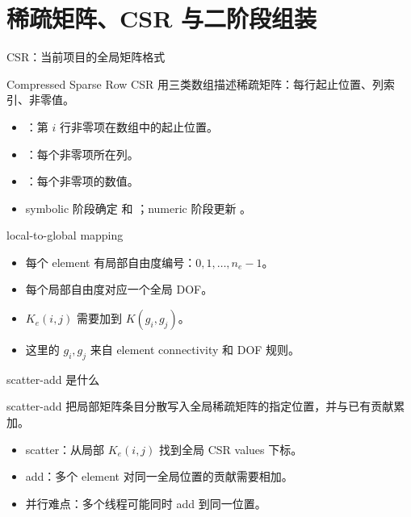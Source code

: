 \section{稀疏矩阵、CSR 与二阶段组装}

\begin{frame}{CSR：当前项目的全局矩阵格式}
\begin{block}{Compressed Sparse Row}
CSR 用三类数组描述稀疏矩阵：每行起止位置、列索引、非零值。
\end{block}
\begin{itemize}
  \item {}：第 $i$ 行非零项在数组中的起止位置。
  \item {}：每个非零项所在列。
  \item {}：每个非零项的数值。
  \item symbolic 阶段确定  和 ；numeric 阶段更新 。
\end{itemize}
\end{frame}

\begin{frame}{local-to-global mapping}
\begin{itemize}
  \item 每个 element 有局部自由度编号：$0,1,\ldots,n_e-1$。
  \item 每个局部自由度对应一个全局 DOF。
  \item $K_e(i,j)$ 需要加到 $K(g_i,g_j)$。
  \item 这里的 $g_i,g_j$ 来自 element connectivity 和 DOF 规则。
\end{itemize}
\end{frame}

\begin{frame}{scatter-add 是什么}
\begin{block}{scatter-add}
把局部矩阵条目分散写入全局稀疏矩阵的指定位置，并与已有贡献累加。
\end{block}
\begin{itemize}
  \item scatter：从局部 $K_e(i,j)$ 找到全局 CSR values 下标。
  \item add：多个 element 对同一全局位置的贡献需要相加。
  \item 并行难点：多个线程可能同时 add 到同一位置。
\end{itemize}
\end{frame}


